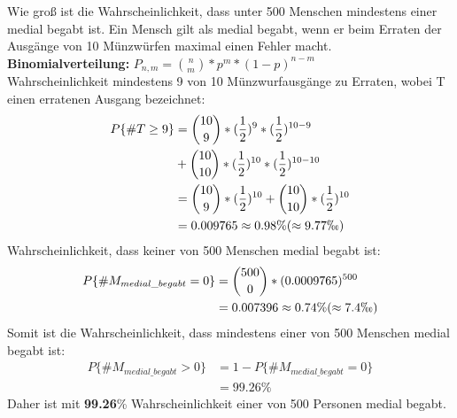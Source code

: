     Wie groß ist die Wahrscheinlichkeit, dass unter 500 Menschen mindestens einer medial begabt ist. Ein Mensch gilt als medial begabt, wenn er beim Erraten der Ausgänge von 10 Münzwürfen maximal einen Fehler macht.\\
    \newline
    \textbf{Binomialverteilung:} $ P_{n,m} = \binom{n}{m} * p^m * (1-p)^{n-m} $ \\
    \newline
    Wahrscheinlichkeit mindestens 9 von 10 Münzwurfausgänge zu Erraten, wobei T einen erratenen Ausgang bezeichnet:
    \begin{equation}
      \begin{split}
        P\{ \# T \geq 9 \} & = \binom{10}{9} * (\frac{1}{2})^9 * (\frac{1}{2})^{10-9} \\
        & + \binom{10}{10} * (\frac{1}{2})^{10} * (\frac{1}{2})^{10-10} \\
        & = \binom{10}{9} * (\frac{1}{2})^{10} + \binom{10}{10} * (\frac{1}{2})^{10} \\
        & = 0.009765 \approx 0.98\% (\approx 9.77 \permil )
      \end{split}
    \end{equation}
    Wahrscheinlichkeit, dass keiner von 500 Menschen medial begabt ist:
    \begin{equation}
      \begin{split}
        P\{ \# M_{medial\_ begabt} = 0 \} & = \binom{500}{0} * (0.0009765)^{500} \\
        & = 0.007396 \approx 0.74\% (\approx 7.4 \permil )
      \end{split}
    \end{equation}
    Somit ist die Wahrscheinlichkeit, dass mindestens einer von 500 Menschen medial begabt ist:
    \begin{equation}
      \begin{split}
        P\{ \# M_{medial\_ begabt} > 0 \} & = 1 - P\{ \# M_{medial\_ begabt} = 0 \} \\
        & = 99.26\%
      \end{split}
    \end{equation}
    Daher ist mit \textbf{99.26}\% Wahrscheinlichkeit einer von 500 Personen medial begabt.


